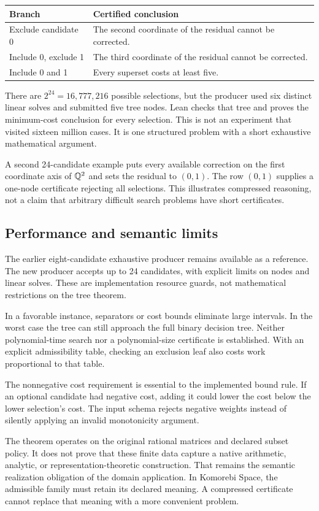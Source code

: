 \begin{center}
\begin{tabularx}{\linewidth}{@{}lX@{}}
\toprule Branch & Certified conclusion\\\midrule
Exclude candidate 0 & The second coordinate of the residual cannot be corrected.\\
Include 0, exclude 1 & The third coordinate of the residual cannot be corrected.\\
Include 0 and 1 & Every superset costs at least five.\\
\bottomrule
\end{tabularx}
\end{center}

There are $2^{24}=16{,}777{,}216$ possible selections, but the producer used six distinct linear solves and submitted five tree nodes. Lean checks that tree and proves the minimum-cost conclusion for every selection. This is not an experiment that visited sixteen million cases. It is one structured problem with a short exhaustive mathematical argument.

A second 24-candidate example puts every available correction on the first coordinate axis of $\mathbb{Q}^2$ and sets the residual to $(0,1)$. The row $(0,1)$ supplies a one-node certificate rejecting all selections. This illustrates compressed reasoning, not a claim that arbitrary difficult search problems have short certificates.

\subsection{Performance and semantic limits}

The earlier eight-candidate exhaustive producer remains available as a reference. The new producer accepts up to 24 candidates, with explicit limits on nodes and linear solves. These are implementation resource guards, not mathematical restrictions on the tree theorem.

In a favorable instance, separators or cost bounds eliminate large intervals. In the worst case the tree can still approach the full binary decision tree. Neither polynomial-time search nor a polynomial-size certificate is established. With an explicit admissibility table, checking an exclusion leaf also costs work proportional to that table.

The nonnegative cost requirement is essential to the implemented bound rule. If an optional candidate had negative cost, adding it could lower the cost below the lower selection's cost. The input schema rejects negative weights instead of silently applying an invalid monotonicity argument.

The theorem operates on the original rational matrices and declared subset policy. It does not prove that these finite data capture a native arithmetic, analytic, or representation-theoretic construction. That remains the semantic realization obligation of the domain application. In Komorebi Space, the admissible family must retain its declared meaning. A compressed certificate cannot replace that meaning with a more convenient problem.

